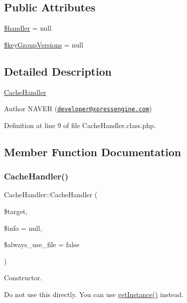 \subsection*{Public Attributes}
\begin{DoxyCompactItemize}
\item 
\hyperlink{classCacheHandler_a390b49c673a6fc10e7091abaca857905}{\$handler} = null
\item 
\hyperlink{classCacheHandler_a1e71d92d2d7a76b72b3415389bbcaf60}{\$key\+Group\+Versions} = null
\end{DoxyCompactItemize}


\subsection{Detailed Description}
\hyperlink{classCacheHandler}{Cache\+Handler}

\begin{DoxyAuthor}{Author}
N\+A\+V\+ER (\href{mailto:developer@xpressengine.com}{\tt developer@xpressengine.\+com}) 
\end{DoxyAuthor}


Definition at line 9 of file Cache\+Handler.\+class.\+php.



\subsection{Member Function Documentation}
\mbox{\label{classCacheHandler_a71cb13c8791b73a8153fd5bbc7aba3e3}} 
\subsubsection{\texorpdfstring{Cache\+Handler()}{CacheHandler()}}
{\footnotesize\ttfamily Cache\+Handler\+::\+Cache\+Handler (\begin{DoxyParamCaption}\item[{}]{\$target,  }\item[{}]{\$info = {\ttfamily null},  }\item[{}]{\$always\+\_\+use\+\_\+file = {\ttfamily false} }\end{DoxyParamCaption})}

Constructor.

Do not use this directly. You can use \hyperlink{classCacheHandler_af6194e9a8be860303f799d8d82757397}{get\+Instance()} instead.

